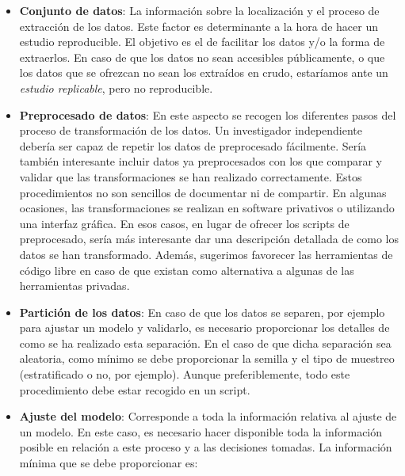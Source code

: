 \documentclass[
  12pt,
  a4paperpaper,
]{report}
\begin{document}
\begin{itemize}
\item
  \textbf{Conjunto de datos}: La información sobre la localización y el
  proceso de extracción de los datos. Este factor es determinante a la
  hora de hacer un estudio reproducible. El objetivo es el de facilitar
  los datos y/o la forma de extraerlos. En caso de que los datos no sean
  accesibles públicamente, o que los datos que se ofrezcan no sean los
  extraídos en crudo, estaríamos ante un \emph{estudio replicable}, pero
  no reproducible.
\item
  \textbf{Preprocesado de datos}: En este aspecto se recogen los
  diferentes pasos del proceso de transformación de los datos. Un
  investigador independiente debería ser capaz de repetir los datos de
  preprocesado fácilmente. Sería también interesante incluir datos ya
  preprocesados con los que comparar y validar que las transformaciones
  se han realizado correctamente. Estos procedimientos no son sencillos
  de documentar ni de compartir. En algunas ocasiones, las
  transformaciones se realizan en software privativos o utilizando una
  interfaz gráfica. En esos casos, en lugar de ofrecer los scripts de
  preprocesado, sería más interesante dar una descripción detallada de
  como los datos se han transformado. Además, sugerimos favorecer las
  herramientas de código libre en caso de que existan como alternativa a
  algunas de las herramientas privadas.
\item
  \textbf{Partición de los datos}: En caso de que los datos se separen,
  por ejemplo para ajustar un modelo y validarlo, es necesario
  proporcionar los detalles de como se ha realizado esta separación. En
  el caso de que dicha separación sea aleatoria, como mínimo se debe
  proporcionar la semilla y el tipo de muestreo (estratificado o no, por
  ejemplo). Aunque preferiblemente, todo este procedimiento debe estar
  recogido en un script.
\item
  \textbf{Ajuste del modelo}: Corresponde a toda la información relativa
  al ajuste de un modelo. En este caso, es necesario hacer disponible
  toda la información posible en relación a este proceso y a las
  decisiones tomadas. La información mínima que se debe proporcionar es:


\end{itemize}
\end{document}
